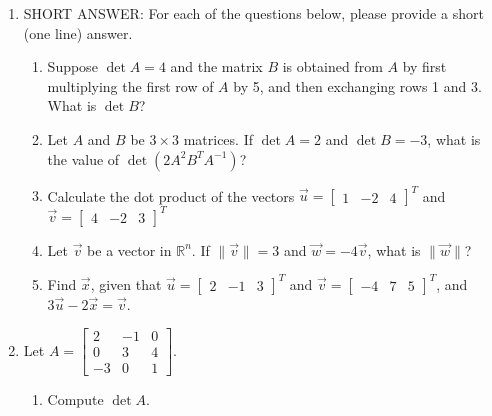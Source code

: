 \documentclass[12pt]{article}
\newcommand{\points}[1]{\marginpar{\hspace{24pt}[#1]}}
\newcommand{\R}{\mathbb{R}}
\newcommand{\len}[1]{\lVert #1\rVert}
\begin{document}
\begin{enumerate}
\item SHORT ANSWER: For each of the questions below, please provide a short (one line) answer.
 \begin{enumerate}
\item Suppose $\det A = 4$ and the matrix $B$ is obtained from $A$ by  \points{2} first multiplying the first row of $A$ by 5, and then exchanging rows 1 and 3. What is $\det B$?

\vspace{1.2in}

\item Let $A$ and $B$ be $3\times 3$ matrices. If $\det A=2$ and $\det B = -3$, what is the value of \points{2} $\det(2A^2B^TA^{-1})$?

\vspace{1.2in}

\item Calculate the dot product of the vectors $\vec{u}=\begin{bmatrix}1&-2&4\end{bmatrix}^T$ and $\vec{v} = \begin{bmatrix}4&-2&3\end{bmatrix}^T$ \points{2}

\vspace{1.2in}

\item Let $\vec{v}$ be a vector in $\R^n$. If $\len{\vec{v}}=3$ and $\vec{w} = -4\vec{v}$, what is $\len{\vec{w}}$? \points{2}

\vspace{1.2in}

\item Find $\vec{x}$, given that $\vec{u} = \begin{bmatrix}2&-1&3\end{bmatrix}^T$ and $\vec{v} = \begin{bmatrix}-4&7&5\end{bmatrix}^T$, and $3\vec{u}-2\vec{x}=\vec{v}$. \points{2}

\end{enumerate}
\newpage

\item Let $A = \begin{bmatrix}2&-1&0\\0&3&4\\-3&0&1\end{bmatrix}$.
\begin{enumerate}
 \item Compute $\det A$. \points{5}


\end{enumerate}
\end{enumerate}
\end{document}
